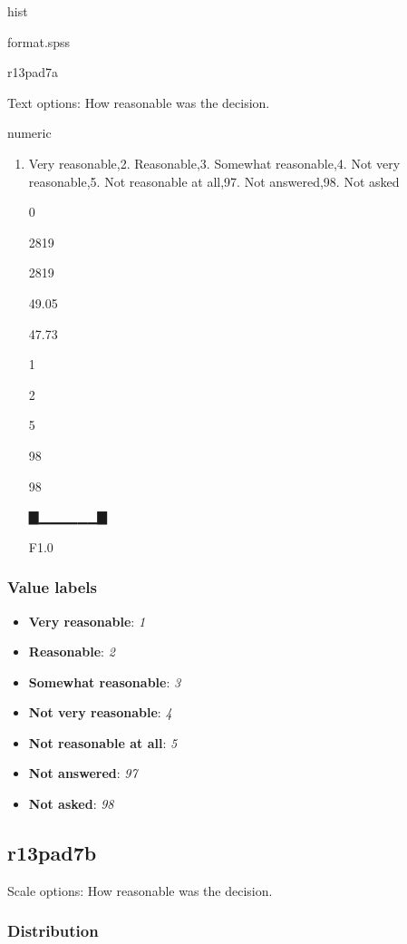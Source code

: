 \documentclass[]{book}
\providecommand{\tightlist}{%
  \setlength{\itemsep}{0pt}\setlength{\parskip}{0pt}}
\begin{document}
hist

format.spss

r13pad7a

Text options: How reasonable was the decision.

numeric

\begin{enumerate}
\def\labelenumi{\arabic{enumi}.}
\tightlist
\item
  Very reasonable,2. Reasonable,3. Somewhat reasonable,4. Not very
  reasonable,5. Not reasonable at all,97. Not answered,98. Not asked

  0

  2819

  2819

  49.05

  47.73

  1

  2

  5

  98

  98

  ▇▁▁▁▁▁▁▇

  F1.0
\end{enumerate}

\subsubsection{Value labels}\label{r13pad7a_labels}

\begin{itemize}
\tightlist
\item
  \textbf{Very reasonable}: \emph{1}
\item
  \textbf{Reasonable}: \emph{2}
\item
  \textbf{Somewhat reasonable}: \emph{3}
\item
  \textbf{Not very reasonable}: \emph{4}
\item
  \textbf{Not reasonable at all}: \emph{5}
\item
  \textbf{Not answered}: \emph{97}
\item
  \textbf{Not asked}: \emph{98}
\end{itemize}

\subsection{r13pad7b}\label{r13pad7b}

Scale options: How reasonable was the decision.

\subsubsection{Distribution}\label{r13pad7b_distribution}
\end{document}
